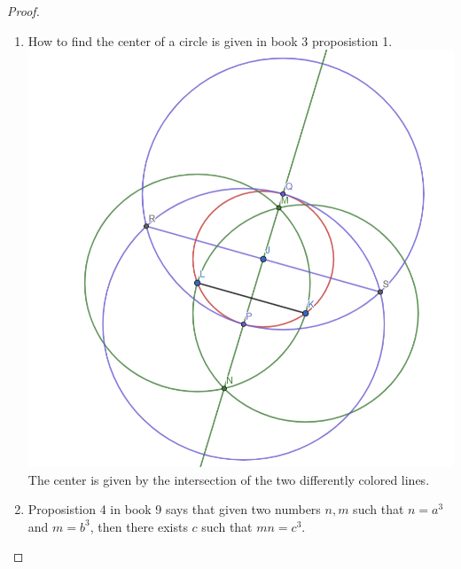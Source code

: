 \documentclass{article}
\begin{document}
\begin{proof}
\begin{enumerate}
		\item How to find the center of a circle is given in book 3 
			proposistion 1.
			\medskip
			\includegraphics[scale=.25]{CenterofCirc_book3prop1.png}
			\medskip
		The center is given by the intersection of the two 
			differently colored lines.

		\item Proposistion 4 in book 9 says that given two numbers 
			$n, m$ such that $n = a^3$ and $m = b^3$, then there
			exists $c$ such that $mn = c^3$. 
	\end{enumerate}	

\end{proof}
\end{document}
